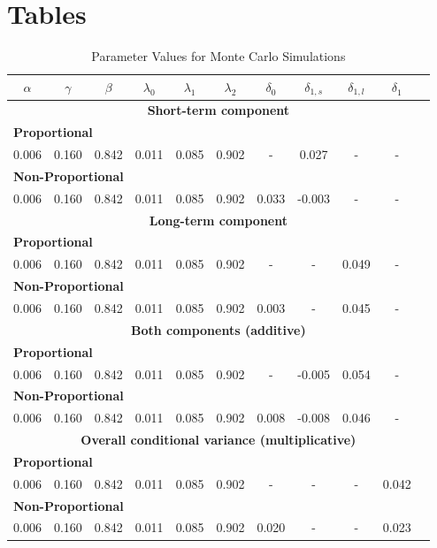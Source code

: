 \documentclass[12pt]{article}
\begin{document}
\section*{Tables}
\begin{table}[!ht]
\centering
\caption{Parameter Values for Monte Carlo Simulations}
\begin{tabular}{ccccccccccc}
\midrule
\midrule
$\alpha$ & $\gamma$ & $\beta$ & $\lambda_0$ & $\lambda_1$ & $\lambda_2$ & $\delta_0$ & $\delta_{1,s}$ & $\delta_{1,l}$ & $\delta_{1}$\\
\midrule
\multicolumn{11}{c}{\textbf{Short-term component}}\\
\multicolumn{11}{l}{\textbf{Proportional}}\\
0.006 & 0.160 & 0.842 & 0.011 & 0.085 & 0.902 & - & 0.027 & - & -\\
\multicolumn{11}{l}{\textbf{Non-Proportional}}\\
0.006 & 0.160 & 0.842 & 0.011 & 0.085 & 0.902 & 0.033 & -0.003 & - & -\\
\midrule
\multicolumn{11}{c}{\textbf{Long-term component}}\\
\multicolumn{11}{l}{\textbf{Proportional}}\\
0.006 & 0.160 & 0.842 & 0.011 & 0.085 & 0.902 & - & - & 0.049  & -\\
\multicolumn{11}{l}{\textbf{Non-Proportional}}\\
0.006 & 0.160 & 0.842 & 0.011 & 0.085 & 0.902 & 0.003 & - & 0.045 & -\\
\midrule
\multicolumn{11}{c}{\textbf{Both components (additive)}}\\
\multicolumn{11}{l}{\textbf{Proportional}}\\
0.006 & 0.160 & 0.842 & 0.011 & 0.085 & 0.902 & - & -0.005 & 0.054 & -\\
\multicolumn{11}{l}{\textbf{Non-Proportional}}\\
0.006 & 0.160 & 0.842 & 0.011 & 0.085 & 0.902 & 0.008 & -0.008 & 0.046 & -\\
\midrule
\multicolumn{11}{c}{\textbf{Overall conditional variance (multiplicative)}}\\
\multicolumn{11}{l}{\textbf{Proportional}}\\
0.006 & 0.160 & 0.842 & 0.011 & 0.085 & 0.902 & - & - & - & 0.042\\
\multicolumn{11}{l}{\textbf{Non-Proportional}}\\
0.006 & 0.160 & 0.842 & 0.011 & 0.085 & 0.902 & 0.020 & - & - & 0.023\\
\midrule

\end{tabular}
\end{table}
\end{document}
